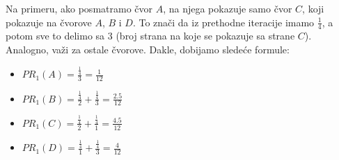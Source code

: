 \documentclass[a4paper]{article}
\begin{document}
Na primeru, ako posmatramo čvor $A$, na njega pokazuje samo čvor $C$, koji pokazuje na čvorove $A$, $B$ i $D$. To znači da iz prethodne iteracije imamo $\frac{1}{4}$, a potom sve to delimo sa $3$ (broj strana na koje se pokazuje sa strane $C$). Analogno, važi za ostale čvorove. Dakle, dobijamo sledeće formule:
\begin{itemize}
\item $PR_1(A) = \frac{\frac{1}{4}}{3} = \frac{1}{12}$
\item $PR_1(B) = \frac{\frac{1}{4}}{2} + \frac{\frac{1}{4}}{3} = \frac{2.5}{12}$
\item $PR_1(C) = \frac{\frac{1}{4}}{2} + \frac{\frac{1}{4}}{1} =\frac{4.5}{12}$
\item $PR_1(D) = \frac{\frac{1}{4}}{1} + \frac{\frac{1}{4}}{3} = \frac{4}{12}$
\end{itemize}
\end{document}
